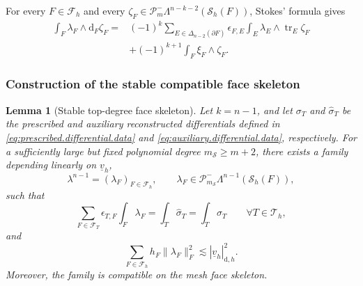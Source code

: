 \documentclass[a4paper,11pt]{article}
\newtheorem{lemma}[theorem]{Lemma}
\theoremstyle{definition}
\newcommand{\DIFF}{\mathrm{d}}
\newcommand{\Sh}{\mathcal{S}_h}
\newcommand{\FM}[1]{\Delta_{#1}}
\newcommand{\PLtrim}[2]{\mathcal{P}_{#1}^{-}\Lambda^{#2}}
\newcommand{\trc}{\operatorname{tr}}
\newcommand{\epsTF}{\epsilon_{T,F}}
\begin{document}
For every $F\in\mathcal F_h$ and every $\zeta_F\in\PLtrim{m}{n-k-2}(\Sh(F))$, Stokes' formula gives
\begin{equation}\label{eq:face.stokes}
\begin{aligned}
  \int_F
  \lambda_F\wedge\DIFF_F\zeta_F
  ={}&
  (-1)^k
  \sum_{E\in\FM{n-2}(\partial F)}
  \epsilon_{F,E}
  \int_E
  \lambda_E\wedge\trc_E\zeta_F
  \\
  &+
  (-1)^{k+1}
  \int_F
  \xi_F\wedge\zeta_F.
\end{aligned}
\end{equation}

\subsubsection{Construction of the stable compatible face skeleton}
\label{subsubsec:skeleton.verification}

\begin{lemma}[Stable top-degree face skeleton]
\label{lem:top.degree.face.skeleton}
Let $k=n-1$, and let $\sigma_T$ and $\widehat\sigma_T$ be the prescribed and auxiliary reconstructed differentials defined in \eqref{eq:prescribed.differential.data} and \eqref{eq:auxiliary.differential.data}, respectively.
For a sufficiently large but fixed polynomial degree $m_{\mathcal S}\geq m+2$, there exists a family depending linearly on $\underline v_h$,
\[
  \lambda^{n-1}
  =
  (\lambda_F)_{F\in\mathcal F_h},
  \qquad
  \lambda_F
  \in
  \PLtrim{m_{\mathcal S}}{n-1}(\Sh(F)),
\]
such that
\[
  \sum_{F\in\mathcal F_T}
  \epsTF
  \int_F\lambda_F
  =
  \int_T\widehat\sigma_T
  =
  \int_T\sigma_T
  \qquad
  \forall T\in\mathcal T_h,
\]
and
\[
  \sum_{F\in\mathcal F_h}
  h_F\|\lambda_F\|_F^2
  \lesssim
  |\underline v_h|_{\DIFF,h}^2.
\]
Moreover, the family is compatible on the mesh face skeleton.
\end{lemma}
\end{document}
